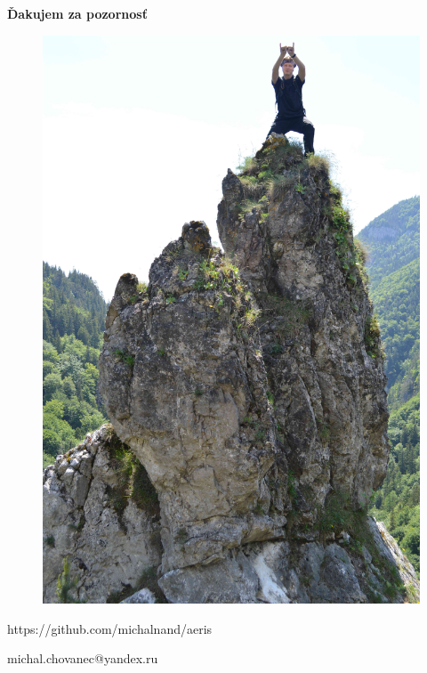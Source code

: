 \documentclass[xcolor=dvipsnames]{beamer}
\begin{document}
\begin{frame}{\bf Ďakujem za pozornosť}

\begin{figure}[ht]
\begin{center}
\begin{minipage}{0.4\linewidth}
\begin{center}
\includegraphics[width=1.0\textwidth]{images/rock.jpg}
\end{center}
\end{minipage}
\end{center}
\end{figure}

\centerline{https://github.com/michalnand/aeris}
\centerline{michal.chovanec@yandex.ru}

\end{frame}
\end{document}
